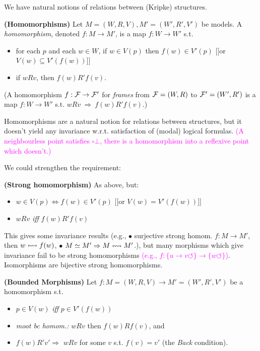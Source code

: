 We have natural notions of relations between (Kripke) structures. 
\begin{definition}\textbf{(Homomorphisms)} Let $M = (W, R, V), M' = (W', R', V')$ be models. A \textit{homomorphism}, denoted $f:M \to M'$, is a map $f:W \to W'$ s.t.
\begin{itemize}
\item for each $p$ and each $w \in W$, if $w \in V(p)$ then $f(w) \in V'(p)$ [[or $V(w) \subseteq V'(f(w))$]]
\item if $wRv$, then $f(w)R'f(v)$.
\end{itemize}
(A homomorphism $f : \mathcal F \to \mathcal F'$ for \textit{frames} from $\mathcal F = (W, R)$ to $\mathcal F' = (W',R')$ is a map $f:W \to W'$ s.t. $wRv~\Rightarrow~f(w)R'f(v)$.)
\end{definition}

Homomorphisms are a natural notion for relations between structures, but it doesn't yield any invariance w.r.t. satisfaction of (modal) logical formulas. \textcolor{magenta}{(A neighbourless point satisfies $\square \bot$, there is a homomorphism into a reflexive point which doesn't.)}

We could strengthen the requirement:
\begin{definition}\textbf{(Strong homomorphism)} As above, but:
\begin{itemize}
\item $w \in V(p) \iff f(w) \in V'(p)$ [[or $V(w) = V'(f(w))$]]
\item $wRv$ \textit{iff} $f(w)R'f(v)$
\end{itemize}
\end{definition}

This gives some invariance results (e.g., $\bullet$ surjective strong homom. $f : M \to M'$, then $w \leftrightsquigarrow f(w)$, $\bullet$ $M \simeq M' \Rightarrow M \leftrightsquigarrow M'$.), 
but many morphisms which give invariance fail to be strong homomorphisms \textcolor{magenta}{(e.g., $f : \{u \to v \circlearrowleft\} \to \{w\circlearrowleft\}$)}. Isomorphisms are bijective strong homomorphisms.

\begin{definition}\textbf{(Bounded Morphisms)} Let $f: M = (W, R, V) \to M' = (W', R', V')$ be a homomorphism s.t.
\begin{itemize}
\item $p \in V(w)$ \textit{iff} $p \in V'(f(w))$
\item \textit{moot bc homom.:} $wRv$ then $f(w)Rf(v)$, and
\item $f(w)R'v' \Rightarrow$ $wRv$ for some $v$ s.t. $f(v) = v'$ (the \textit{Back} condition).
\end{itemize}
\end{definition}

